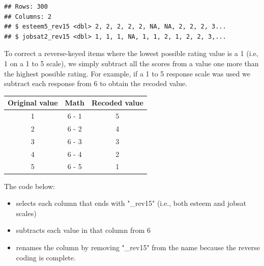 \documentclass[
]{krantz}
\makeatletter
\newenvironment{Shaded}{\begin{snugshade}}{\end{snugshade}}
\newcommand{\DataTypeTok}[1]{\textcolor[rgb]{0.27,0.27,0.27}{#1}}
\newcommand{\DecValTok}[1]{\textcolor[rgb]{0.06,0.06,0.06}{#1}}
\newcommand{\KeywordTok}[1]{\textcolor[rgb]{0.27,0.27,0.27}{\textbf{#1}}}
\newcommand{\NormalTok}[1]{#1}
\newcommand{\OperatorTok}[1]{\textcolor[rgb]{0.43,0.43,0.43}{\textbf{#1}}}
\newcommand{\StringTok}[1]{\textcolor[rgb]{0.5,0.5,0.5}{#1}}
\providecommand{\tightlist}{%
  \setlength{\itemsep}{0pt}\setlength{\parskip}{0pt}}
\newenvironment{kframe}{%
\medskip{}
\setlength{\fboxsep}{.8em}
 \def\at@end@of@kframe{}%
 \ifinner\ifhmode%
  \def\at@end@of@kframe{\end{minipage}}%
  \begin{minipage}{\columnwidth}%
 \fi\fi%
 \def\FrameCommand##1{\hskip\@totalleftmargin \hskip-\fboxsep
 \colorbox{shadecolor}{##1}\hskip-\fboxsep
     \hskip-\linewidth \hskip-\@totalleftmargin \hskip\columnwidth}%
 \MakeFramed {\advance\hsize-\width
   \@totalleftmargin\z@ \linewidth\hsize
   \@setminipage}}%
 {\par\unskip\endMakeFramed%
 \at@end@of@kframe}
\renewenvironment{Shaded}{\begin{kframe}}{\end{kframe}}
\makeatother
\begin{document}
\begin{Shaded}
\end{Shaded}

\begin{verbatim}
## Rows: 300
## Columns: 2
## $ esteem5_rev15 <dbl> 2, 2, 2, 2, 2, NA, NA, 2, 2, 2, 3...
## $ jobsat2_rev15 <dbl> 1, 1, 1, NA, 1, 1, 2, 1, 2, 2, 3,...
\end{verbatim}

To correct a reverse-keyed items where the lowest possible rating value is a 1 (i.e, 1 on a 1 to 5 scale), we simply subtract all the scores from a value one more than the highest possible rating. For example, if a 1 to 5 response scale was used we subtract each response from 6 to obtain the recoded value.

\begin{longtable}[]{@{}ccc@{}}
\toprule
Original value & Math & Recoded value\tabularnewline
\midrule
\endhead
1 & 6 - 1 & 5\tabularnewline
2 & 6 - 2 & 4\tabularnewline
3 & 6 - 3 & 3\tabularnewline
4 & 6 - 4 & 2\tabularnewline
5 & 6 - 5 & 1\tabularnewline
\bottomrule
\end{longtable}

The code below:

\begin{itemize}
\tightlist
\item
  selects each column that ends with "\_rev15" (i.e., both esteem and jobsat scales)
\item
  subtracts each value in that column from 6
\item
  renames the column by removing "\_rev15" from the name because the reverse coding is complete.
\end{itemize}

\begin{Shaded}
\end{Shaded}
\end{document}
